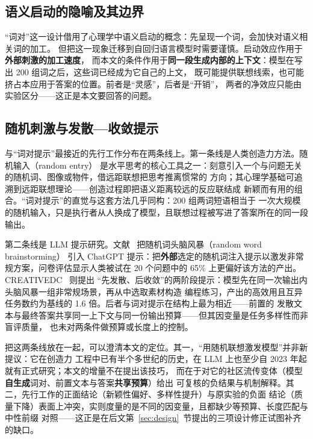 \documentclass[UTF8,11pt,a4paper]{ctexart}
\begin{document}
\subsection{语义启动的隐喻及其边界}

“词对”这一设计借用了心理学中语义启动的概念：先呈现一个词，会加快对语义相关词的加工\cite{meyer1971}。
但把这一现象迁移到自回归语言模型时需要谨慎。启动效应作用于\textbf{外部刺激的加工速度}，
而本文的条件作用于\textbf{同一段生成内部的上下文}：模型在写出 200 组词之后，这些词已经成为它自己的上文，
既可能提供联想线索，也可能挤占本应用于答案的位置。前者是“灵感”，后者是“开销”，
两者的净效应只能由实验区分——这正是本文要回答的问题。

\subsection{随机刺激与发散—收敛提示}

与“词对提示”最接近的先行工作分布在两条线上。第一条线是人类创造力方法。随机输入（random entry）
是水平思考的核心工具之一：刻意引入一个与问题无关的随机词、图像或物件，借远距联想把思考推离惯常的
方向\cite{debono1992}；其心理学基础可追溯到远距联想理论——创造过程即把语义距离较远的反应联结成
新颖而有用的组合\cite{mednick1962}。“词对提示”的直觉与这套方法几乎同构：200 组两词短语相当于
一次大规模的随机输入，只是执行者从人换成了模型，且联想过程被写进了答案所在的同一段输出。

第二条线是 LLM 提示研究。文献~\cite{taveekit2023rwb} 把随机词头脑风暴（random word brainstorming）
引入 ChatGPT 提示：把\textbf{外部}选定的随机词注入提示以激发非常规方案，问卷评估显示人类被试在
20 个问题中的 65\% 上更偏好该方法的产出。CREATIVEDC~\cite{nguyen2025creative} 则提出
“先发散、后收敛”的两阶段提示：模型先在同一次输出内头脑风暴一组非常规场景，再从中选取素材构造
编程练习，产出的高效用且互异任务数约为基线的 1.6 倍。后者与词对提示在结构上最为相近——前置的
发散文本与最终答案共享同一上下文与同一份输出预算——但其因变量是任务多样性而非盲评质量，
也未对两条件做预算或长度上的控制。

把这两条线放在一起，可以澄清本文的定位。其一，“用随机联想激发模型”并非新提议：它在创造力
工程中已有半个多世纪的历史，在 LLM 上也至少自 2023 年起就有正式研究；本文的增量不在提出该技巧，
而在于对它的社区流传变体（模型\textbf{自生成}词对、前置文本与答案\textbf{共享预算}）给出
可复核的负结果与机制解释。其二，先行工作的正面结论（新颖性偏好、多样性提升）与原实验的负面
结论（质量下降）表面上冲突，实则度量的是不同的因变量，且都缺少等预算、长度匹配与中性前缀
对照——这正是在后文第~\ref{sec:design}~节提出的三项设计修正试图补齐的缺口。
\end{document}

